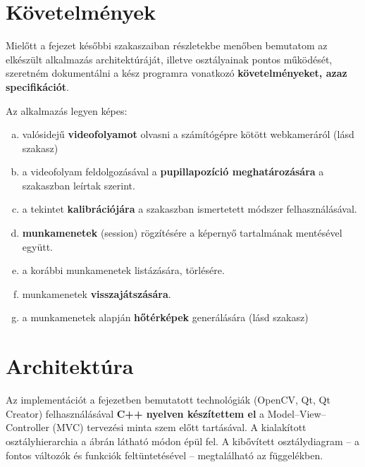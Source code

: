 \section{Követelmények}\label{sect:kovetelmenyek}

Mielőtt a fejezet későbbi szakaszaiban részletekbe menőben bemutatom az elkészült alkalmazás architektúráját, illetve osztályainak pontos működését, szeretném dokumentálni a kész programra vonatkozó \textbf{követelményeket, azaz specifikációt}.

\bigskip

Az alkalmazás legyen képes:

\begin{enumerate}[a)]
  \item valósidejű \textbf{videofolyamot} olvasni a számítógépre kötött webkameráról (lásd  szakasz)
  \item a videofolyam feldolgozásával a \textbf{pupillapozíció meghatározására} a  szakaszban leírtak szerint.
  \item a tekintet \textbf{kalibrációjára} a  szakaszban ismertetett módszer felhasználásával.
  \item \textbf{munkamenetek} (session) rögzítésére a képernyő tartalmának mentésével együtt.
  \item a korábbi munkamenetek listázására, törlésére.
  \item munkamenetek \textbf{visszajátszására}.
  \item a munkamenetek alapján \textbf{hőtérképek} generálására (lásd  szakasz)
\end{enumerate}

\section{Architektúra}\label{sect:architektura}
  
  Az implementációt a  fejezetben bemutatott technológiák (OpenCV, Qt, Qt Creator) felhasználásával \textbf{C++ nyelven készítettem el} a Model--View--Controller (MVC) tervezési minta szem előtt tartásával. A kialakított osztályhierarchia a  ábrán látható módon épül fel. A kibővített osztálydiagram  -- a fontos változók és funkciók feltüntetésével -- megtalálható az  függelékben.
  
